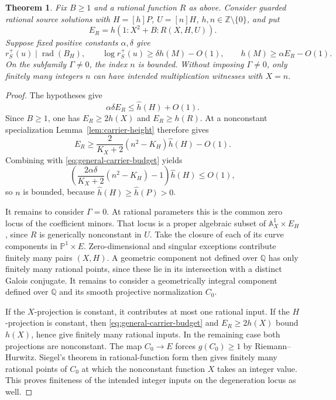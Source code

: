 \documentclass[11pt,a4paper]{article}
\newtheorem{theorem}{Theorem}[section]
\newcommand{\Q}{\mathbb Q}\newcommand{\Z}{\mathbb Z}
\begin{document}
\begin{theorem}\label{thm:fixed-carrier}
Fix $B\ge1$ and a rational function $R$ as above. Consider guarded
rational source solutions with $H=[h]P$, $U=[n]H$,
$h,n\in\Z\setminus\{0\}$, and put
\[
             E_R=h(1:X^2+B:R(X,H,U)).
\]
Suppose fixed positive constants $\alpha,\delta$ give
\[
 r_S^+(u)\mid\operatorname{rad}(B_H),\qquad
 \log r_S^+(u)\ge\delta h(M)-O(1),\qquad
 h(M)\ge\alpha E_R-O(1).
\]
On the subfamily $\Gamma\ne0$, the index $n$ is bounded.
Without imposing $\Gamma\ne0$, only finitely many integers $n$
can have intended multiplication witnesses with $X=n$.
\end{theorem}
\begin{proof}
The hypotheses give
\begin{equation}\label{eq:general-carrier-budget}
                       \alpha\delta E_R\le\widehat h(H)+O(1).
\end{equation}
Since $B\ge1$, one has $E_R\ge2h(X)$ and $E_R\ge h(R)$.
At a nonconstant specialization Lemma~\ref{lem:carrier-height}
therefore gives
\[
 E_R\ge\frac{2}{K_X+2}(n^2-K_H)\widehat h(H)-O(1).
\]
Combining with \eqref{eq:general-carrier-budget} yields
\[
 \left(\frac{2\alpha\delta}{K_X+2}(n^2-K_H)-1\right)
                         \widehat h(H)\le O(1),
\]
so $n$ is bounded, because $\widehat h(H)\ge\widehat h(P)>0$.

It remains to consider $\Gamma=0$. At rational parameters this
is the common zero locus of the coefficient minors. That locus
is a proper algebraic subset of $\mathbb A^1_X\times E_H$,
since $R$ is generically nonconstant in $U$. Take the closure of each of its curve
components in $\mathbb P^1\times E$. Zero-dimensional and
singular exceptions contribute finitely many pairs $(X,H)$.
A geometric component not defined over $\Q$ has only finitely
many rational points, since these lie in its intersection with
a distinct Galois conjugate. It remains to consider a
geometrically integral component defined over $\Q$ and its
smooth projective normalization $C_0$.

If the $X$-projection is constant, it contributes at most one
rational input. If the $H$-projection is constant, then
\eqref{eq:general-carrier-budget} and $E_R\ge2h(X)$ bound
$h(X)$, hence give finitely many rational inputs. In the remaining
case both projections are nonconstant. The map $C_0\to E$
forces $g(C_0)\ge1$ by Riemann--Hurwitz. Siegel's theorem in
rational-function form \cite[Theorem 1.1]{Levin} then gives
finitely many rational points of $C_0$ at which the nonconstant
function $X$ takes an integer value. This proves finiteness of
the intended integer inputs on the degeneration locus as well.
\end{proof}
\end{document}
